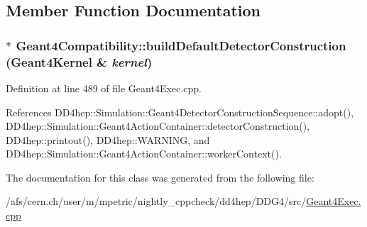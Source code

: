 \subsection{Member Function Documentation}
\hypertarget{class_geant4_compatibility_abe1c52fe3962756ab59bc3cdde7edca2}{
\subsubsection[{buildDefaultDetectorConstruction}]{ $\ast$ Geant4Compatibility::buildDefaultDetectorConstruction ({\bf Geant4Kernel} \& {\em kernel})}}
\label{class_geant4_compatibility_abe1c52fe3962756ab59bc3cdde7edca2}


Definition at line 489 of file Geant4Exec.cpp.

References DD4hep::Simulation::Geant4DetectorConstructionSequence::adopt(), DD4hep::Simulation::Geant4ActionContainer::detectorConstruction(), DD4hep::printout(), DD4hep::WARNING, and DD4hep::Simulation::Geant4ActionContainer::workerContext().

The documentation for this class was generated from the following file:\begin{DoxyCompactItemize}
\item 
/afs/cern.ch/user/m/mpetric/nightly\_\-cppcheck/dd4hep/DDG4/src/\hyperlink{_geant4_exec_8cpp}{Geant4Exec.cpp}\end{DoxyCompactItemize}
